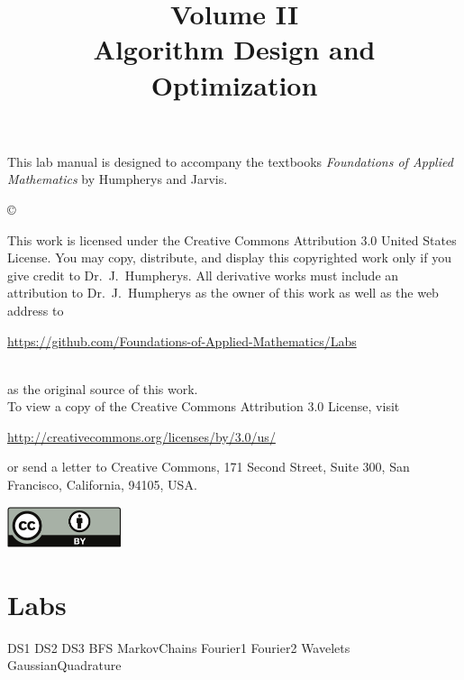 \documentclass[opener-c,labs,red,nociteref]{HJnewsiambook}
\title{Volume II\\ Algorithm Design and Optimization}
\begin{document}

\thispagestyle{empty} %
\maketitle
\thispagestyle{empty}
\frontmatter



\begin{thepreface} %

This lab manual is designed to accompany the textbooks \emph{Foundations of Applied Mathematics} by Humpherys and Jarvis.

\vfill
\copyright{This work is licensed under the Creative Commons Attribution 3.0 United States
License.  You may copy, distribute, and display this copyrighted work only if you give
credit to Dr.~J.~Humpherys. All derivative works must include an attribution to Dr.~J.~Humpherys as the owner of this work as well as the web address to
\\\centerline{\url{https://github.com/Foundations-of-Applied-Mathematics/Labs}}\\as the original source of this work.
\\To view a copy of the Creative Commons Attribution 3.0 License, visit
\\\centerline{\url{http://creativecommons.org/licenses/by/3.0/us/}} or send a letter to Creative Commons, 171 Second Street, Suite 300, San Francisco, California, 94105, USA.}

\vfill
\centering\includegraphics[height=1.2cm]{by.pdf}
\vfill
\end{thepreface}

\setcounter{tocdepth}{1}
\tableofcontents

\mainmatter %

\part{Labs}
{DS1}
{DS2}
{DS3}
{BFS}
{MarkovChains}
{Fourier1}
{Fourier2}
{Wavelets}
{GaussianQuadrature}
\end{document}
